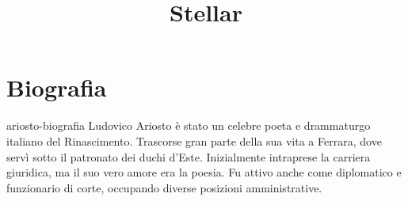 \documentclass[preview]{standalone}
\begin{document}
\title{Stellar}
\genpage

\section{Biografia}

\begin{snippet}{ariosto-biografia}
    Ludovico Ariosto è stato un celebre poeta e drammaturgo italiano del Rinascimento.
    Trascorse gran parte della sua vita a Ferrara, dove servì sotto il patronato
    dei duchi d'Este. Inizialmente intraprese la carriera giuridica,
    ma il suo vero amore era la poesia.
    Fu attivo anche come diplomatico e funzionario di corte,
    occupando diverse posizioni amministrative.
    
\end{snippet}
\end{document}
